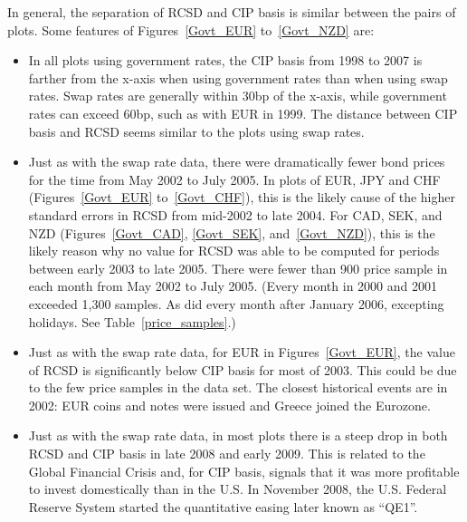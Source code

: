 In general, the separation of RCSD and CIP basis is similar between the pairs of plots. Some features of Figures~\ref{Govt_EUR} to~\ref{Govt_NZD} are:
\begin{itemize}

\item In all plots using government rates, the CIP basis from 1998 to 2007 is farther from the x-axis when using government rates than when using swap rates.  Swap rates are generally within 30bp of the x-axis, while government rates can exceed 60bp, such as with EUR in 1999.  The distance between CIP basis and RCSD seems similar to the plots using swap rates.

\item Just as with the swap rate data, there were dramatically fewer bond prices for the time from May 2002 to July 2005.  In plots of EUR, JPY and CHF (Figures~\ref{Govt_EUR} to~\ref{Govt_CHF}), this is the likely cause of the higher standard errors in RCSD from mid-2002 to late 2004.  For CAD, SEK, and NZD (Figures~\ref{Govt_CAD}, \ref{Govt_SEK}, and~\ref{Govt_NZD}), this is the likely reason why no value for RCSD was able to be computed for periods between early 2003 to late 2005.
There were fewer than 900 price sample in each month from May 2002 to July 2005.  (Every month in 2000 and 2001 exceeded 1,300 samples.  As did every month after January 2006, excepting holidays.  See Table~\ref{price_samples}.)  



\item Just as with the swap rate data, for EUR in Figures~\ref{Govt_EUR}, the value of RCSD is significantly below CIP basis for most of 2003.  This could be due to the few price samples in the data set.  The closest historical events are in 2002: EUR coins and notes were issued and Greece joined the Eurozone.  

\item Just as with the swap rate data, in most plots there is a steep drop in both RCSD and CIP basis in late 2008 and early 2009.  This is related to the Global Financial Crisis and, for CIP basis, signals that it was more profitable to invest domestically than in the U.S\@.  In November 2008, the U.S. Federal Reserve System started the quantitative easing later known as ``QE1''.  


\end{itemize}
